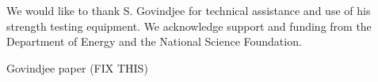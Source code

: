 \documentclass[final]{svjour2}
\begin{document}
\begin{acknowledgements}
We would like to thank S. Govindjee for technical assistance and use of his strength testing equipment. We acknowledge support and funding from the Department of Energy and the National Science Foundation.
\end{acknowledgements}

\pagebreak

\begin{thebibliography}{99}

Govindjee paper (FIX THIS)

\end{thebibliography}
\end{document}

